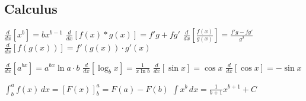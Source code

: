 \begin{center}\section{Calculus}\end{center}

\newcommand{\DERIVATIVE}{\frac{d}{dx}}

$ \DERIVATIVE[x^b] = bx^{b-1} $
\hspace{5ex}
$ \DERIVATIVE[f(x) * g(x)] = f'g + fg' $
\hspace{5ex}
$ \DERIVATIVE[\frac{f(x)}{g(x)}] = \frac{f'g - fg'}{g^2} $
\hspace{5ex}
$ \DERIVATIVE[f(g(x))] = f'(g(x)) \cdot g'(x) $

\vspace{1em}

$ \DERIVATIVE[a^{bx}] = a^{bx}\ln{a} \cdot b $
\hspace{5ex}
$ \DERIVATIVE[\log_b{x}] = \frac{1}{x\ln{b}} $
\hspace{5ex}
$ \DERIVATIVE[\sin{x}] = \cos{x} $
\hspace{5ex}
$ \DERIVATIVE[\cos{x}] = -\sin{x} $

\vspace{1em}

$ \int_b^a f(x)\,dx = [F(x)]_b^a = F(a) - F(b)$
\hspace{5ex}
$ \int x^b\,dx = \frac{1}{b+1}x^{b+1} + C $
\hspace{5ex}
